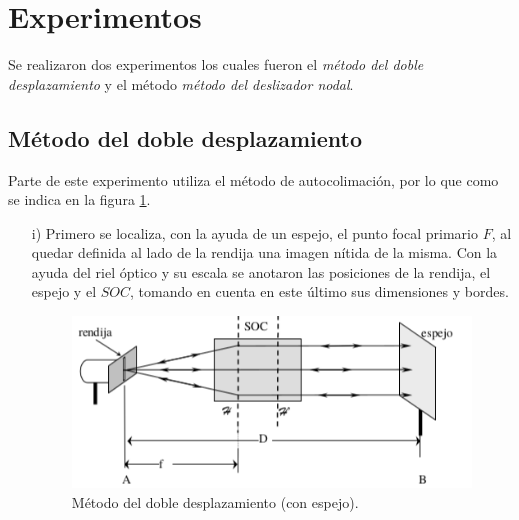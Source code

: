 \documentclass[13,twocolumn,letterpaper]{article}
\begin{document}
\section{Experimentos}
{
	Se realizaron dos experimentos los cuales fueron el \emph{m\'etodo del doble desplazamiento} y el m\'etodo \emph{método del deslizador nodal}.
	\subsection{M\'etodo del doble desplazamiento}
	{
		Parte de este experimento utiliza el método de autocolimación, por lo que como se indica en la
		figura \ref{fig:fig4}.
		\begin{itemize}
			\item [ i) ] Primero se localiza, con la ayuda de un espejo, el punto focal primario $F$, al quedar
			definida al lado de la rendija una imagen nítida de la misma. Con la ayuda del riel óptico y su
			escala se anotaron  las posiciones de la rendija, el espejo y el $SOC$, tomando en cuenta en este último
			sus dimensiones y bordes.
			\begin{figure}[h!]
				\centering
				\includegraphics[width=1.0\linewidth]{fig4}
				\caption{\footnotesize{M\'etodo del doble desplazamiento (con espejo).}}
				\label{fig:fig4}
			\end{figure}
			

\end{itemize}}}
\end{document}
